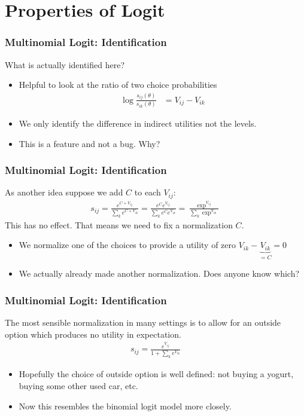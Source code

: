 \section{Properties of Logit}


\begin{frame}
\frametitle{Multinomial Logit: Identification}
What is actually identified here?
\begin{itemize}
\item Helpful to look at the ratio of two choice probabilities
\begin{align*}
\log \frac{s_{ij}(\theta)}{s_{ik}(\theta)} 
&= V_{ij} - V_{ik}
\end{align*}
\item We only identify the \alert{difference in indirect utilities} not the levels.
\item This is a feature and not a bug. Why?
\end{itemize}
\end{frame}

\begin{frame}
\frametitle{Multinomial Logit: Identification}
As another idea suppose we add $C$ to each $V_{ij}$:
\begin{align*}
s_{ij} = \frac{e^{C+ V_{ij}} }{\sum_k e^{C + V_{ik}}} 
       = \frac{e^C e^{ V_{ij}} }{\sum_k e^C e^{V_{ik}}}
       =\frac{\exp^{V_{ij}} }{\sum_k \exp^{ V_{ik}}} 
\end{align*}
This has no effect.  That means we need to fix a normalization $C$.\\
\begin{itemize}
\item We normalize one of the choices to provide a utility of zero $V_{ik}-\underbrace{V_{ik}}_{=C}=0$
\item We actually already made another normalization. Does anyone know which?
\end{itemize}
\end{frame}


\begin{frame}
\frametitle{Multinomial Logit: Identification}
The most sensible normalization in many settings is to allow for an \alert{outside option} which produces no utility in expectation.
\begin{align*}
s_{ij} = \frac{e^{V_{ij}}}{1+\sum_k e^{V_{ik} }} 
\end{align*}
\begin{itemize}
\item Hopefully the choice of outside option is well defined: not buying a yogurt, buying some other used car, etc.
\item Now this resembles the binomial logit model more closely.
\end{itemize}
\end{frame}


